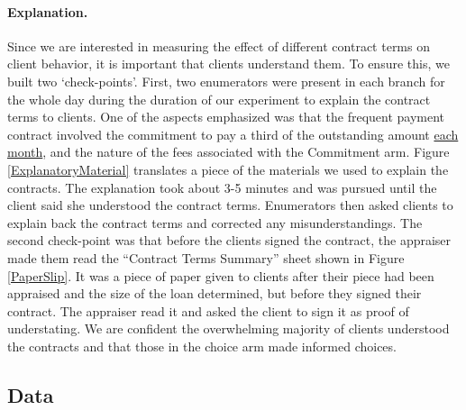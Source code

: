 \documentclass[oneside,11pt]{article}
\begin{document}
\paragraph{Explanation.} Since we are interested in measuring the effect of different contract terms on client behavior, it is important that clients understand them. To ensure this, we built two `check-points'.  First, two enumerators were present in each branch for the whole day during the duration of our experiment to explain the contract terms to clients. One of the aspects emphasized was that the frequent payment contract involved the commitment to pay a third of the outstanding amount \underline{each month}, and the nature of the fees associated with the Commitment arm. Figure \ref{ExplanatoryMaterial} translates a piece of the materials we used to explain the contracts. The explanation took about 3-5 minutes and was pursued until the client said she understood the contract terms. Enumerators then asked clients to explain back the contract terms and corrected any misunderstandings. The second check-point was that before the clients signed the contract, the appraiser made them read the ``Contract Terms Summary'' sheet shown in Figure \ref{PaperSlip}. It was a piece of paper given to clients after their piece had been appraised and the size of the loan determined, but before they signed their contract. The appraiser read it and asked the client to sign it as proof of understating. %
We are confident the overwhelming majority of clients understood the contracts and that those in the choice arm made informed choices.


\subsection{Data}
\end{document}
